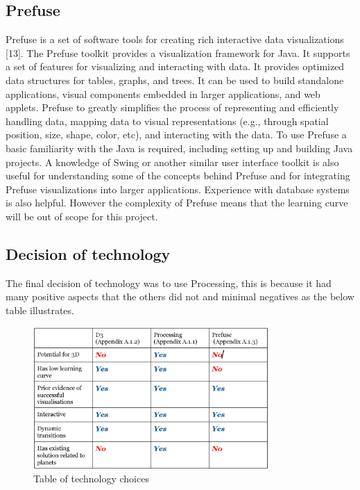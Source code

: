 \subsection{Prefuse}
Prefuse is a set of software tools for creating rich interactive data
visualizations [13]. The
Prefuse toolkit provides a visualization framework for Java. It supports a set
of features
for visualizing and interacting with data. It provides optimized data structures
for tables,
graphs, and trees. It can be used to build standalone applications, visual
components embedded
in larger applications, and web applets. Prefuse to greatly simplifies the
process
of representing and efficiently handling data, mapping data to visual
representations (e.g.,
through spatial position, size, shape, color, etc), and interacting with the
data.
To use Prefuse a basic familiarity with the Java is required, including setting
up and building
Java projects. A knowledge of Swing or another similar user interface toolkit is
also
useful for understanding some of the concepts behind Prefuse and for integrating
Prefuse
visualizations into larger applications. Experience with database systems is
also helpful. 
However the complexity of Prefuse means that the learning curve will be out of
scope for
this project.


\subsection{Decision of technology}
The final decision of technology was to use Processing, this is because it had
many positive aspects that the others did not and minimal negatives as the below
table illustrates.
\clearpage
\begin{figure}[H]
  \centering
      \includegraphics[width=0.8\textwidth]{images/table_technologies.jpg}
  \caption{Table of technology choices}
\end{figure}

